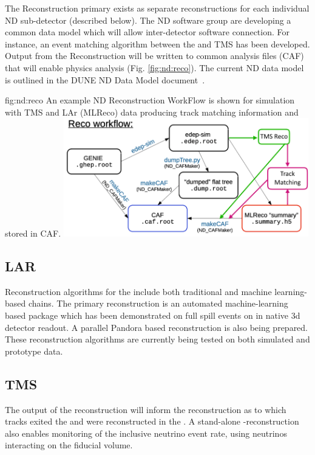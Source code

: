 \documentclass[../main-v1.tex]{subfiles}
\begin{document}
The  Reconstruction primary exists as separate reconstructions for each individual ND sub-detector (described below). The ND software group are developing a common data model which will allow inter-detector software connection. For instance, an event matching algorithm between the  and TMS has been developed. Output from the Reconstruction will be written to common analysis files (CAF) that will enable physics analysis (Fig. \ref{fig:nd:reco}). The current ND data model is outlined in the DUNE ND Data Model document~\cite{bib:docdb24735}.

\begin{dunefigure}
{fig:nd:reco}
{An example ND Reconstruction WorkFlow is shown for simulation with TMS and LAr (MLReco) data producing track matching information and stored in CAF.}
{\includegraphics[width=0.8\textwidth]{graphics/ND/ND-Reco-workflow.png}}
\end{dunefigure}

\subsection{LAR}
 Reconstruction algorithms for the  include both traditional and machine learning-based chains. The primary reconstruction is an automated machine-learning based package which has been demonstrated on full spill events on in native 3d detector readout. A parallel Pandora based reconstruction is also being prepared. These reconstruction algorithms are currently being tested on both simulated and prototype data. 

\subsection{TMS}
The output of the  reconstruction will inform the  reconstruction as to which tracks exited the  and were reconstructed in the . A stand-alone -reconstruction also enables monitoring of the inclusive neutrino event rate, using neutrinos interacting on the  fiducial volume.
\end{document}
